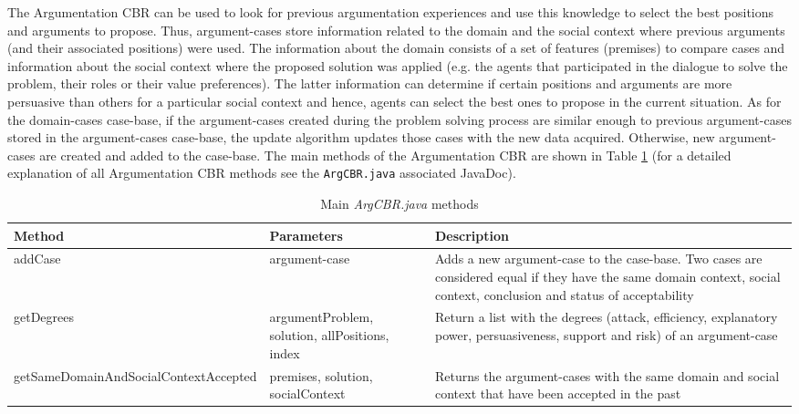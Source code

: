 The Argumentation CBR can be used to look for previous argumentation experiences and use this knowledge to select the best positions and arguments to propose. Thus, argument-cases store information related to the domain and the social context where previous arguments (and their associated positions) were used. The information about the domain consists of a set of features (premises) to compare cases and information about the social context where the proposed solution was applied (e.g. the agents that participated in the dialogue to solve the problem, their roles or their value preferences). The latter information can determine if certain positions and arguments are more persuasive than others for a particular social context and hence, agents can select the best ones to propose in the current situation. As for the domain-cases case-base, if the argument-cases created during the problem solving process are similar enough to previous argument-cases stored in the argument-cases case-base, the update algorithm updates those cases with the new data acquired. Otherwise, new argument-cases are created and added to the case-base.
The main methods of the Argumentation CBR are shown in Table \ref{tab:ArgCBRMethods} (for a detailed explanation of all Argumentation CBR methods see the \lstinline{ArgCBR.java} associated JavaDoc).

\begin{table}[h!t]
\begin{tabular}{|p{4cm}|p{3cm}|p{6cm}|}
\hline
\textbf{Method} & \textbf{Parameters} & \textbf{Description} \\ \hline
addCase & argument-case & Adds a new argument-case to the case-base. Two cases are considered equal if they have the same domain context, social context, conclusion and status of acceptability \\ \hline
getDegrees & argumentProblem, solution, allPositions, index & Return a list with the degrees (attack, efficiency, explanatory power, persuasiveness, support and risk) of an argument-case \\ \hline
getSameDomainAnd\-SocialContextAccepted & premises, solution, socialContext & Returns the argument-cases with the same domain and social context that have been accepted in the past \\ \hline
\end{tabular}
\caption{Main \textit{ArgCBR.java} methods}
\label{tab:ArgCBRMethods}
\end{table}

